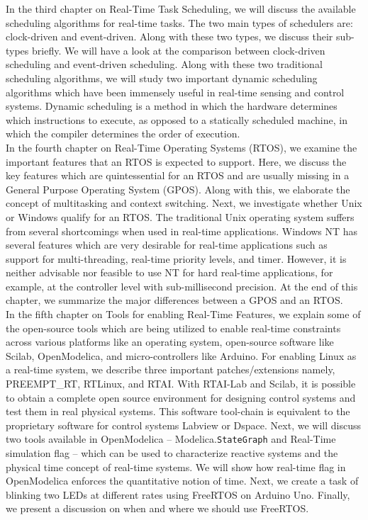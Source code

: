 \documentclass[12pt]{report}
\begin{document}
In the third chapter on Real-Time Task Scheduling, we will discuss the available scheduling algorithms for real-time tasks. The two main types of schedulers are: clock-driven and event-driven. Along with these two types, we discuss their sub-types briefly. We will have a look at the comparison between clock-driven scheduling and event-driven scheduling. Along with these two traditional scheduling algorithms, we will study two important dynamic scheduling algorithms which have been immensely useful in real-time sensing and control systems. Dynamic scheduling is a method in which the hardware determines which instructions to execute, as opposed to a statically scheduled machine, in which the compiler determines the order of execution. \\ 

In the fourth chapter on Real-Time Operating Systems (RTOS), we examine the important features that an RTOS is expected to support. Here, we discuss the key features which are quintessential for an RTOS and are usually missing in a General Purpose Operating System (GPOS). Along with this, we elaborate the concept of multitasking and context switching. Next, we investigate whether Unix or Windows qualify for an RTOS.  The  traditional  Unix  operating  system suffers  from  several  shortcomings  when  used  in  real-time  applications. Windows NT has several features which are very desirable for real-time applications such as support for multi-threading, real-time priority levels, and timer. However, it is neither advisable nor feasible to use NT for hard real-time applications, for example, at the controller level with sub-millisecond precision. At the end of this chapter, we summarize the major differences between a GPOS and an RTOS. \\

In the fifth chapter on Tools for enabling Real-Time Features, we explain some of the open-source tools which are being utilized to enable real-time constraints across various platforms like an operating system, open-source software like Scilab, OpenModelica, and micro-controllers like Arduino. For enabling Linux as a real-time system, we describe three important patches/extensions namely, PREEMPT\_RT, RTLinux, and RTAI. With RTAI-Lab and Scilab,  it is possible to obtain a complete open source environment for designing control systems and test them in real physical systems.  This software tool-chain is equivalent to the proprietary software for control systems Labview or Dspace. Next, we will discuss two tools available in OpenModelica – Modelica.\texttt{StateGraph} and Real-Time simulation flag – which can be used to characterize reactive systems and the physical time concept of real-time systems. We will show how real-time flag in OpenModelica enforces the quantitative notion of time. Next, we create a task of blinking two LEDs at different rates using FreeRTOS on Arduino Uno. Finally, we present a discussion on when and where we should use FreeRTOS. 
 
\end{document}

